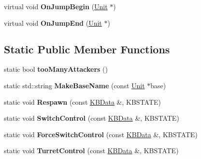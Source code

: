 \begin{DoxyCompactItemize}
\item 
virtual void {\bfseries On\+Jump\+Begin} (\hyperlink{classUnit}{Unit} $\ast$)\hypertarget{classCockpit_a2a7edac20ed33ca5c90bc66bb2d10b3b}{}\label{classCockpit_a2a7edac20ed33ca5c90bc66bb2d10b3b}

\item 
virtual void {\bfseries On\+Jump\+End} (\hyperlink{classUnit}{Unit} $\ast$)\hypertarget{classCockpit_a9baa7c2f6653bfdd204ed71c1b5bbfc4}{}\label{classCockpit_a9baa7c2f6653bfdd204ed71c1b5bbfc4}

\end{DoxyCompactItemize}
\subsection*{Static Public Member Functions}
\begin{DoxyCompactItemize}
\item 
static bool {\bfseries too\+Many\+Attackers} ()\hypertarget{classCockpit_af7c4a90f2ae4746257b6a0cc1afcb5a5}{}\label{classCockpit_af7c4a90f2ae4746257b6a0cc1afcb5a5}

\item 
static std\+::string {\bfseries Make\+Base\+Name} (const \hyperlink{classUnit}{Unit} $\ast$base)\hypertarget{classCockpit_afbeafa66ea5b336343607cfabe26f484}{}\label{classCockpit_afbeafa66ea5b336343607cfabe26f484}

\item 
static void {\bfseries Respawn} (const \hyperlink{classKBData}{K\+B\+Data} \&, K\+B\+S\+T\+A\+TE)\hypertarget{classCockpit_a2de15ff63a53432bed802bbfe4d65af2}{}\label{classCockpit_a2de15ff63a53432bed802bbfe4d65af2}

\item 
static void {\bfseries Switch\+Control} (const \hyperlink{classKBData}{K\+B\+Data} \&, K\+B\+S\+T\+A\+TE)\hypertarget{classCockpit_af332c0c16dd186014682fcf55414e551}{}\label{classCockpit_af332c0c16dd186014682fcf55414e551}

\item 
static void {\bfseries Force\+Switch\+Control} (const \hyperlink{classKBData}{K\+B\+Data} \&, K\+B\+S\+T\+A\+TE)\hypertarget{classCockpit_ad8f76c663b208f5de615475f31515f70}{}\label{classCockpit_ad8f76c663b208f5de615475f31515f70}

\item 
static void {\bfseries Turret\+Control} (const \hyperlink{classKBData}{K\+B\+Data} \&, K\+B\+S\+T\+A\+TE)\hypertarget{classCockpit_a8668683eb6cad415ea99a3f9e525e589}{}\label{classCockpit_a8668683eb6cad415ea99a3f9e525e589}

\end{DoxyCompactItemize}
